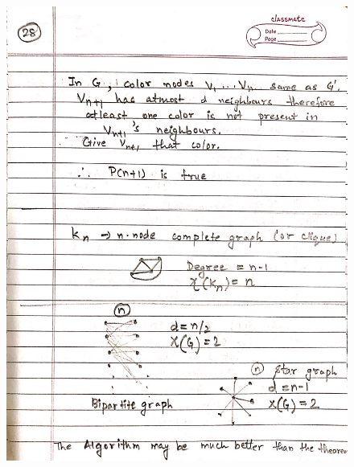 \begin{figure}[H]
    \centering
    \includegraphics[scale=0.25]{"./MIT-6.042J/MIT-6042J-028"}
\end{figure}
\newpage
